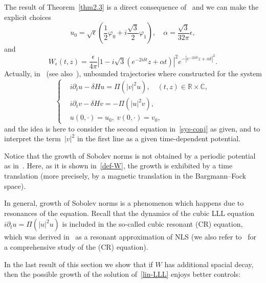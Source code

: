 \documentclass[AHL,Unicode,published]{cedram}
\newcommand{\C}{\mathbb{C}}
\newcommand{\R}{\mathbb{R}}
\newcommand*\eps{\epsilon}
\newcommand*\dis{\displaystyle}
\newcommand{\<}{\langle}
\renewcommand{\>}{\rangle}
\renewcommand{\phi}{\varphi}
\newcommand{\R}{\mathbb{R}}
\begin{document}
The result of Theorem~\ref{thm2.3} is a direct consequence of~\cite[Theorem~1.5 and Corollary~1.6]{Schw-Tho} and we can make the explicit choices
\[
\dis u_0=\sqrt{\eps} \left(\frac12\phi_0+i\frac{\sqrt{3}}2\phi_1\right), \quad \alpha=\frac{\sqrt{3}}{32 \pi}\eps,
\]
and
\begin{equation}\label{def-W}
W_\eps(t,z)=\frac{\eps}{4\pi}\left| 1-i\sqrt{3}\left(e^{-2i \delta t}z+\alpha t\right) \right|^2e^{-\left|e^{-2i \delta t}z+\alpha t\right|^2}.
\end{equation}
Actually, in~\cite[Theorem~1.5 and Corollary~1.6]{Schw-Tho} (see also~\cite[equation~(2.4)]{Schw-Tho}), unbounded trajectories where constructed for the system
\begin{equation}\label{sys-conj}
\left\{
\begin{aligned}
&i\partial_{t}{u}-\delta H{u} = \Pi \left(|{v}|^2 {u}\right), \quad (t,z)\in \R\times \C,\\
&i\partial_{t}{v}-\delta H{v}= - \Pi \left(|{u}|^2 {v}\right),\\
&{u}(0,\cdot)= u_0,\; {v}(0,\cdot)= v_0,
\end{aligned}
\right.
\end{equation}
and the idea is here to consider the second equation in~\eqref{sys-conj} as given, and to interpret the term~$|v|^2$ in the first line as a given time-dependent potential.

Notice that the growth of Sobolev norms is not obtained by a periodic potential as in~\cite{BGMR2,Delort}. Here, as it is shown in~\eqref{def-W}, the growth is exhibited by a time translation (more precisely, by a magnetic translation in the Bargmann--Fock space).

In general, growth of Sobolev norms is a phenomenon which happens due to resonances of the equation. Recall that the dynamics of the cubic LLL equation $i \partial_t u = \Pi(|u|^2u)$ is included in the so-called cubic resonant (CR) equation, which was derived in~\cite{FGH} as a resonant approximation of NLS (we also refer to~\cite{GHT1} for a comprehensive study of the (CR) equation).


In the last result of this section we show that if $W$ has additional spacial decay, then the possible growth of the solution of~\eqref{lin-LLL} enjoys better controls:
\end{document}
